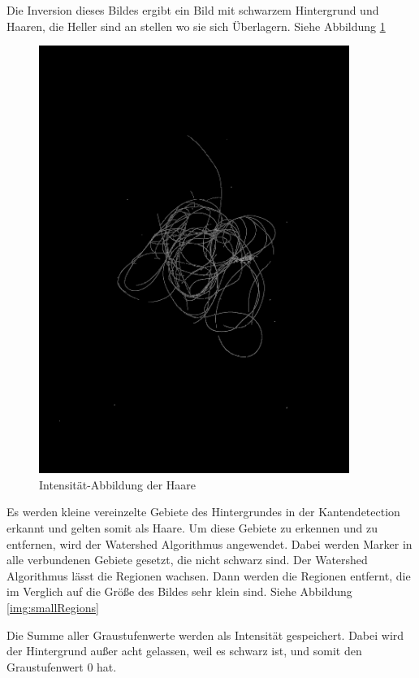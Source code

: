 \documentclass[german,a4paper,12pt]{llncs}
\begin{document}
Die Inversion dieses Bildes ergibt ein Bild mit schwarzem Hintergrund und Haaren, die Heller sind an stellen wo sie sich Überlagern. Siehe Abbildung \ref{img:Intensity}
\begin{figure}
	\centering
	\includegraphics[width=0.9\textwidth]{fig64/05intenstiy.png}
	\caption[]{Intensität-Abbildung der Haare}
	\label{img:Intensity}
\end{figure}

Es werden kleine vereinzelte Gebiete des Hintergrundes in der Kantendetection erkannt und gelten somit als Haare.
Um diese Gebiete zu erkennen und zu entfernen, wird der Watershed Algorithmus angewendet.   
Dabei werden Marker in alle verbundenen Gebiete gesetzt, die nicht schwarz sind. Der Watershed Algorithmus lässt die Regionen wachsen. 
Dann werden die Regionen entfernt, die im Verglich auf die Größe des Bildes sehr klein sind. Siehe Abbildung \ref{img:smallRegions}

Die Summe aller Graustufenwerte werden als Intensität gespeichert. Dabei wird der Hintergrund außer acht gelassen, weil es schwarz ist, und somit den Graustufenwert 0 hat.
\end{document}
